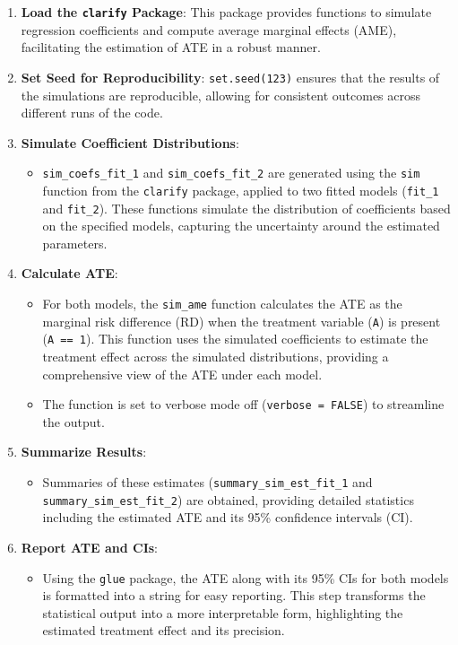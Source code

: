 \documentclass[
  singlecolumn]{article}
\providecommand{\tightlist}{%
  \setlength{\itemsep}{0pt}\setlength{\parskip}{0pt}}\usepackage{longtable,booktabs,array}
\begin{document}
\begin{enumerate}
\def\labelenumi{\arabic{enumi}.}
\item
  \textbf{Load the \texttt{clarify} Package}: This package provides
  functions to simulate regression coefficients and compute average
  marginal effects (AME), facilitating the estimation of ATE in a robust
  manner.
\item
  \textbf{Set Seed for Reproducibility}: \texttt{set.seed(123)} ensures
  that the results of the simulations are reproducible, allowing for
  consistent outcomes across different runs of the code.
\item
  \textbf{Simulate Coefficient Distributions}:

  \begin{itemize}
  \tightlist
  \item
    \texttt{sim\_coefs\_fit\_1} and \texttt{sim\_coefs\_fit\_2} are
    generated using the \texttt{sim} function from the \texttt{clarify}
    package, applied to two fitted models (\texttt{fit\_1} and
    \texttt{fit\_2}). These functions simulate the distribution of
    coefficients based on the specified models, capturing the
    uncertainty around the estimated parameters.
  \end{itemize}
\item
  \textbf{Calculate ATE}:

  \begin{itemize}
  \tightlist
  \item
    For both models, the \texttt{sim\_ame} function calculates the ATE
    as the marginal risk difference (RD) when the treatment variable
    (\texttt{A}) is present (\texttt{A\ ==\ 1}). This function uses the
    simulated coefficients to estimate the treatment effect across the
    simulated distributions, providing a comprehensive view of the ATE
    under each model.
  \item
    The function is set to verbose mode off (\texttt{verbose\ =\ FALSE})
    to streamline the output.
  \end{itemize}
\item
  \textbf{Summarize Results}:

  \begin{itemize}
  \tightlist
  \item
    Summaries of these estimates (\texttt{summary\_sim\_est\_fit\_1} and
    \texttt{summary\_sim\_est\_fit\_2}) are obtained, providing detailed
    statistics including the estimated ATE and its 95\% confidence
    intervals (CI).
  \end{itemize}
\item
  \textbf{Report ATE and CIs}:

  \begin{itemize}
  \tightlist
  \item
    Using the \texttt{glue} package, the ATE along with its 95\% CIs for
    both models is formatted into a string for easy reporting. This step
    transforms the statistical output into a more interpretable form,
    highlighting the estimated treatment effect and its precision.
  \end{itemize}
\end{enumerate}
\end{document}
